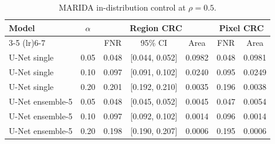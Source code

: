 \begin{table}[t]
\centering
\footnotesize
\setlength{\tabcolsep}{3pt}
\begin{tabular}{lcccccc}
\toprule
Model & $\alpha$ & \multicolumn{3}{c}{Region CRC} & \multicolumn{2}{c}{Pixel CRC} \\
\cmidrule(lr){3-5} \cmidrule(lr){6-7}
 &  & FNR & 95\% CI & Area & FNR & Area \\
\midrule
U-Net single & 0.05 & 0.048 & [0.044, 0.052] & 0.0982 & 0.048 & 0.0981 \\
U-Net single & 0.10 & 0.097 & [0.091, 0.102] & 0.0240 & 0.095 & 0.0249 \\
U-Net single & 0.20 & 0.201 & [0.192, 0.210] & 0.0035 & 0.196 & 0.0038 \\
U-Net ensemble-5 & 0.05 & 0.048 & [0.045, 0.052] & 0.0045 & 0.047 & 0.0054 \\
U-Net ensemble-5 & 0.10 & 0.097 & [0.092, 0.102] & 0.0014 & 0.096 & 0.0014 \\
U-Net ensemble-5 & 0.20 & 0.198 & [0.190, 0.207] & 0.0006 & 0.195 & 0.0006 \\
\bottomrule
\end{tabular}
\caption{MARIDA in-distribution control at $\rho=0.5$.}
\label{tab:marida_indist}
\end{table}
